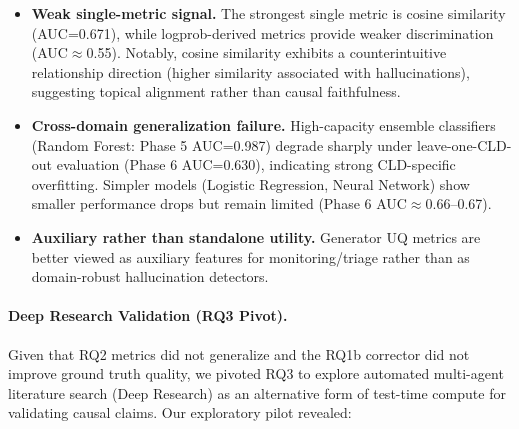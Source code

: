 \begin{itemize}[noitemsep]
    \item \textbf{Weak single-metric signal.} The strongest single metric is cosine similarity (AUC=0.671), while logprob-derived metrics provide weaker discrimination (AUC$\approx$0.55). Notably, cosine similarity exhibits a counterintuitive relationship direction (higher similarity associated with hallucinations), suggesting topical alignment rather than causal faithfulness.
    
    \item \textbf{Cross-domain generalization failure.} High-capacity ensemble classifiers (Random Forest: Phase 5 AUC=0.987) degrade sharply under leave-one-CLD-out evaluation (Phase 6 AUC=0.630), indicating strong CLD-specific overfitting. Simpler models (Logistic Regression, Neural Network) show smaller performance drops but remain limited (Phase 6 AUC$\approx$0.66--0.67).
    
    \item \textbf{Auxiliary rather than standalone utility.} Generator UQ metrics are better viewed as auxiliary features for monitoring/triage rather than as domain-robust hallucination detectors.
\end{itemize}

\paragraph{Deep Research Validation (RQ3 Pivot).}
Given that RQ2 metrics did not generalize and the RQ1b corrector did not improve ground truth quality, we pivoted RQ3 to explore automated multi-agent literature search (Deep Research) as an alternative form of test-time compute for validating causal claims. Our exploratory pilot revealed:

